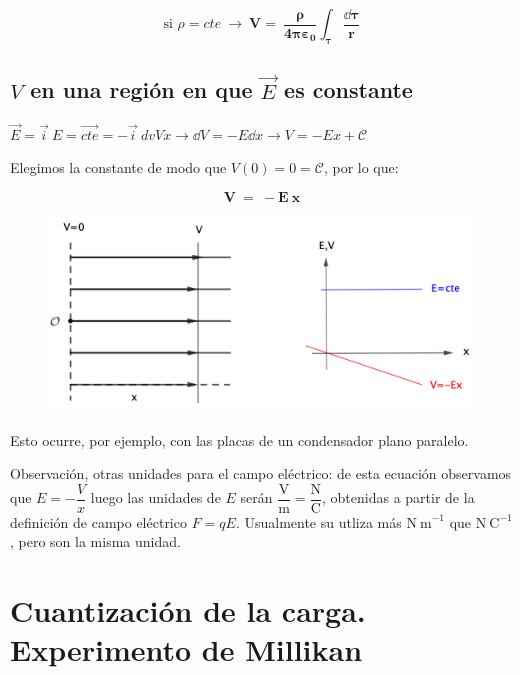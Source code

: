 \begin{equation}
\text{si } \rho=cte \ \to \ 	\boldsymbol{V=\ \dfrac {\rho}{4\pi \varepsilon_0} \int_\tau \dfrac{ \dd \tau}{r}}
\end{equation}

\subsection{$V$ en una región en que $\vec{E}$ es constante}
\label{EV-Ecte}

$\displaystyle \overrightarrow{E}=\vec i\ E= \overrightarrow{cte} = -\vec i\ dv{V}{x} \to \dd V=-E \dd x \to V=-Ex+\mathcal C$

\normalsize{Elegimos la constante de modo que $V(0)=0=\mathcal C$, por lo que:}

\begin{equation}
\boldsymbol{V \ = \ - E\ x}	
\end{equation}

\vspace{-5mm} %
\begin{figure}[H]
	\centering
	\includegraphics[width=.9\textwidth]{imagenes/imagenes22/T22IM10.png}
\end{figure}
\vspace{-5mm} %
Esto ocurre, por ejemplo, con las placas de un condensador plano paralelo.

Observación, otras unidades para el campo eléctrico: de esta ecuación observamos que $E=-\dfrac V x$ luego las unidades de $E$ serán $ \dfrac {\mathrm{V}} {\mathrm{m}}=\dfrac{\mathrm{N}}{\mathrm{C}}$, obtenidas a partir de la definición de campo eléctrico $F=qE$. Usualmente su utliza más $ \mathrm{N\ m}^{-1}$ que  $\mathrm{N\ C}^{-1}$, pero son la misma unidad.

\section[Cuantización de la carga. Experimento de Millikan]{Cuantización de la carga. Experimento de Millikan}

